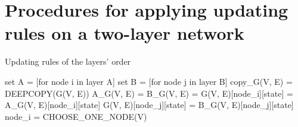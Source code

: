 \chapter{Procedures for applying updating rules on a two-layer network}
\label{appendixC}
\begin{breakablealgorithm}
	\caption{Updating rules of the layers' order}
	\label{layers_order}
	\begin{algorithmic} 
			\State set A = [for node i in layer A]
			\State set B = [for node j in layer B]
					\State {}
                	\State {}
            	\EndIf
			    	\State {}
			   		\State {}
				\EndIf
			\EndIf
				\State copy\_G(V, E) = DEEPCOPY(G(V, E))
				\State A\_G(V, E) = 
				\State B\_G(V, E) = 
					\State G(V, E)[node\_i][state] =  A\_G(V, E)[node\_i][state]
				\EndFor
					\State G(V, E)[node\_j][state] =  B\_G(V, E)[node\_j][state]
				\EndFor
			\EndIf
				\State node\_i = CHOOSE\_ONE\_NODE(V)
					\State {}
				\EndIf
					\State {}
				\EndIf
			\EndIf
		\EndFunction
	\end{algorithmic}
\end{breakablealgorithm}


